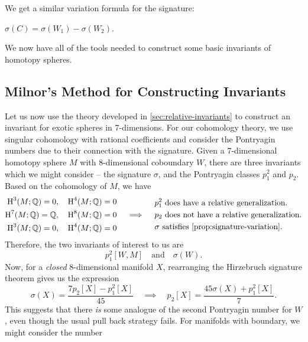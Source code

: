 We get a similar variation formula for the signature:

\begin{proposition}\label{prop:signature-variation}
	$\sigma(C)=\sigma(W_1)-\sigma(W_2)$.
\end{proposition}

We now have all of the tools needed to construct some basic invariants of homotopy spheres.

\subsection{Milnor's Method for Constructing Invariants}\label{sec:milnor-method}

Let us now use the theory developed in \cref{sec:relative-invariants} to construct an invariant for exotic spheres in 7-dimensions. For our cohomology theory, we use singular cohomology with rational coefficients and consider the Pontryagin numbers due to their connection with the signature.
Given a 7-dimensional homotopy sphere $M$ with 8-dimensional coboundary $W$, there are three invariants which we might consider -- the signature $\sigma$, and the Pontryagin classes $p_1^2$ and $p_2$.
Based on the cohomology of $M$, we have
\[
	\begin{aligned}
		\H^3(M; \Q)=0,  & \quad \H^4(M; \Q)=0 \\
		\H^7(M; \Q)=\Q, & \quad \H^8(M; \Q)=0 \\
		\H^3(M; \Q)=0,  & \quad \H^4(M; \Q)=0
	\end{aligned}
	\quad\implies\quad
	\begin{aligned}
		 & p_1^2\textrm{ does have a relative generalization.}        \\
		 & p_2\textrm{ does not have a relative generalization.}      \\
		 & \sigma\textrm{ satisfies \cref{prop:signature-variation}.}
	\end{aligned}
\]
Therefore, the two invariants of interest to us are
\[
	p_1^2[W,M]
	\quad\textrm{and}\quad
	\sigma(W).
\]
Now, for a \emph{closed} $8$-dimensional manifold $X$, rearranging the Hirzebruch signature theorem gives us the expression
\begin{equation}\label{eq:7-manifold_rearrangement}
	\sigma(X) = \frac{7p_2[X] - p_1^2[X]}{45}
	\quad\implies\quad
	p_2[X] = \frac{45\sigma(X) + p_1^2[X]}{7}.
\end{equation}
This suggests that there \emph{is} some analogue of the second Pontryagin number for $W$, even though the usual pull back strategy fails. For manifolds with boundary, we might consider the number
